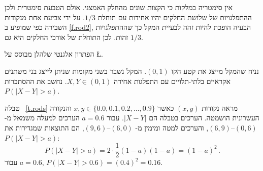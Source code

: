 
אין סימטריה במלקות כי הקצות שונים מהחלק האמצני. אולם הטבעת סימטרית ולכן ההתפלגויות של שלושת החלקים יהיו אחידות עם תוחלת
$1/3$.
על ידי צביעת אחת מנקודות השבירה כפי שמופיע ב%
\ref{f.rod2},
הבעיה הופכת להיות זהה לבעיית המקל כך שההתפלגויות זהות. לכן התוחלת של אורכי החלקים היא גם
$1/3$.


הפתרון אלגנטי שלהלן מבוסס על
\L{\cite{stack-rods}}.

נניח שהמקל מייצג את קטע הקו 
$(0,1)$.
המקל נשבר בשני מקומות שניתן לייצג בני משתנים אקראיים בלתי-תלויים עם התפלגות אחידה
$X,Y\in (0,1)$.
נחשב את ההסתברות
$P(|X-Y|>a)$.

טבלה%
~\ref{t.rods}
מראה נקודות 
$(x,y)$
כאשר
$x,y \in \{0.0, 0.1, 0.2, \ldots, 0.9\}$
והנקודה העשרונית הושמטה. הערכים בטבלה הם
$|X-Y|$.
עבור
$a=0.6$
הערכים למעלה משמאל מ-%
$(0,6)$--$(6,9)$,
והערכים למטה ומימין מ-%
$(6,0)$--$(9,6)$,
הם התוצאות שמגדירות את
$P(|X-Y|>a)$:
\[
P(|X-Y|>a)=2\cdot \frac{1}{2}(1-a)(1-a)=(1-a)^2\,.
\]
עבור
$a=0.6$, $P(|X-Y|>0.6)=(0.4)^2=0.16$.

